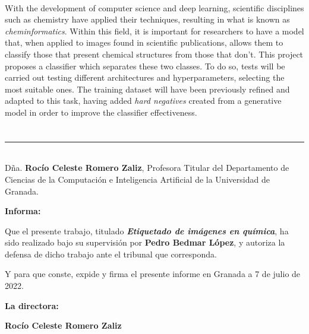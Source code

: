 \vspace{0.7cm}
\\

With the development of computer science and deep learning, scientific disciplines such as chemistry have applied their techniques, resulting in what is known as \textit{cheminformatics}. Within this field, it is important for researchers to have a model that, when applied to images found in scientific publications, allows them to classify those that present chemical structures from those that don't. This project proposes a classifier which separates these two classes. To do so, tests will be carried out testing different architectures and hyperparameters, selecting the most suitable ones. The training dataset will have been previously refined and adapted to this task, having added \textit{hard negatives} created from a generative model in order to improve the classifier effectiveness.


\chapter*{}
\thispagestyle{empty}

\noindent\rule[-1ex]{\textwidth}{2pt}\\[4.5ex]

Dña. \textbf{Rocío Celeste Romero Zaliz}, Profesora Titular del Departamento de Ciencias de la Computación e Inteligencia Artificial de la Universidad de Granada.


\vspace{0.5cm}

\textbf{Informa:}

\vspace{0.5cm}

Que el presente trabajo, titulado \textit{\textbf{Etiquetado de imágenes en química}},
ha sido realizado bajo su supervisión por \textbf{Pedro Bedmar López}, y autoriza la defensa de dicho trabajo ante el tribunal que corresponda.

\vspace{0.5cm}

Y para que conste, expide y firma el presente informe en Granada a 7 de julio de 2022.

\vspace{1cm}

\textbf{La directora:}

\vspace{5cm}

\noindent \textbf{Rocío Celeste Romero Zaliz}
